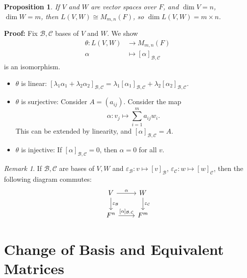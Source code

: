 \documentclass[12pt]{article}
\newtheorem{proposition}{Proposition}[section]
\theoremstyle{definition}
\theoremstyle{remark}
\newtheorem*{remark}{Remark}
\begin{document}
\begin{proposition}
If $V$ and $W$ are vector spaces over $F$, and $\dim V = n$, $\dim W = m$, then $L(V, W) \cong M_{m, n}(F)$, so $\dim L(V, W) = m \times n$.
\end{proposition}

\begin{adjustbox}{minipage = \columnwidth - 25.5pt, margin=1em, frame=1pt, margin=0em}
\textbf{Proof:} Fix $\mathcal{B}, \mathcal{C}$ bases of $V$ and $W$. We show
\begin{align*}
	\theta : L(V, W) &\to M_{m, n}(F) \\
	\alpha &\mapsto [\alpha]_{\mathcal{B}, \mathcal{C}}
\end{align*}
is an isomorphism.
\begin{itemize}
	\item $\theta$ is linear:
		$[\lambda_1 \alpha_1 + \lambda_2 \alpha_2]_{\mathcal{B}, \mathcal{C}} = \lambda_1 [\alpha_1]_{\mathcal{B}, \mathcal{C}} + \lambda_2[\alpha_2]_{\mathcal{B}, \mathcal{C}}$.
	\item $\theta$ is surjective: Consider $A = (a_{ij})$. Consider the map
		\[
		\alpha : v_j \mapsto \sum_{i = 1}^{m} a_{ij}w_i
		.\]
		This can be extended by linearity, and $[\alpha]_{\mathcal{B}, \mathcal{C}} = A$.
	\item $\theta$ is injective: If $[\alpha]_{\mathcal{B}, \mathcal{C}} = 0$, then $\alpha = 0$ for all $v$.
\end{itemize}

\end{adjustbox}

\begin{remark}
	If $\mathcal{B}, \mathcal{C}$ are bases of $V, W$ and $\varepsilon_{\mathcal{B}} : v \mapsto [v]_{\mathcal{B}}$, $\varepsilon_{\mathcal{C}} : w \mapsto [w]_{\mathcal{C}}$, then the following diagram commutes:
	\[
		\begin{tikzcd}
			V \arrow[r, "\alpha"] \arrow[d, "\varepsilon_{\mathcal{B}}"] & W \arrow[d, "\varepsilon_{\mathcal{C}}"] \\
			F^{n} \arrow[r, "{[\alpha]_{\mathcal{B},\mathcal{C}}}"] & F^{m}
		\end{tikzcd}
	\] 
\end{remark}

\newpage

\section{Change of Basis and Equivalent Matrices}%
\label{sec:change_of_basis_and_equivalent_matrices}
\end{document}
